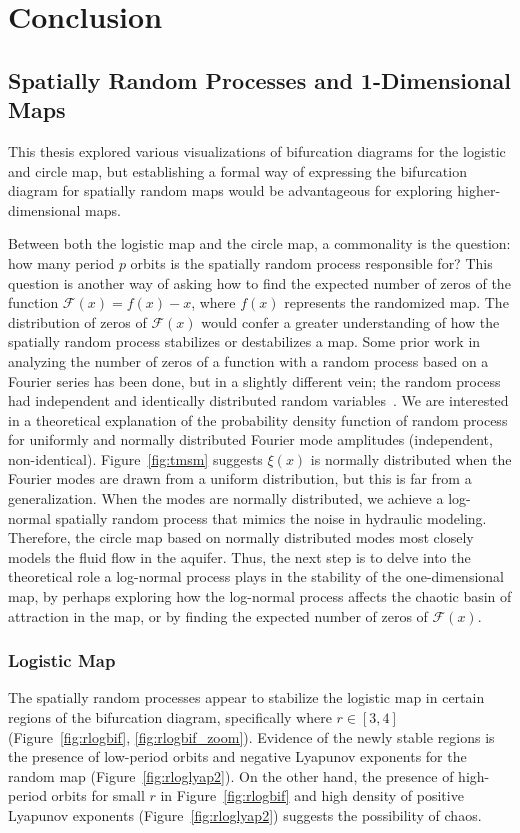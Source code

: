 \chapter{Conclusion}
\section{Spatially Random Processes and 1-Dimensional Maps}
This thesis explored various visualizations of bifurcation diagrams
for the logistic and circle map, but establishing a formal way of
expressing the bifurcation diagram for spatially random maps would
be advantageous for exploring higher-dimensional maps.

Between both the logistic map and the circle map, a commonality is the
question: how many period $p$ orbits is the spatially random process
responsible for? This question is another way of asking how to find
the expected number of zeros of the function $\mathcal{F}(x)=f(x)-x$, where $f(x)$ represents the
randomized map. The distribution of zeros of
$\mathcal{F}(x)$ would confer a greater understanding of how the
spatially random process stabilizes or destabilizes a map. Some prior
work in analyzing the number of zeros of a function with a random
process based on a Fourier series has been done, but in a slightly
different vein; the random process had independent and identically
distributed random variables~\cite{kahane}. We are interested in a theoretical
explanation of the probability density function of random process for
uniformly and normally distributed Fourier mode amplitudes
(independent, non-identical). Figure~\ref{fig:tmsm} suggests $\xi(x)$
is normally distributed when the Fourier modes are drawn from a
uniform distribution, but this is far from a generalization. When the
modes are normally distributed, we achieve a log-normal spatially
random process that mimics the noise in hydraulic modeling. Therefore,
the circle
map based on normally distributed modes most closely models the fluid
flow in the aquifer. Thus, the
next step is to delve into the theoretical role a log-normal process plays in the
stability of the one-dimensional map, by perhaps exploring how the
log-normal process affects the chaotic basin of attraction in the map,
or by finding the expected number of zeros of $\mathcal{F}(x)$.

\subsection{Logistic Map}
The spatially random processes appear to stabilize the logistic map in
certain regions of the bifurcation diagram, specifically where $r \in [3,4]$
(Figure~\ref{fig:rlogbif}, \ref{fig:rlogbif_zoom}). Evidence of the
newly stable regions is the presence of low-period orbits and negative
Lyapunov exponents for the random map (Figure~\ref{fig:rloglyap2}). On
the other hand, the presence of high-period orbits for
small $r$ in Figure~\ref{fig:rlogbif} and high density of positive
Lyapunov exponents (Figure~\ref{fig:rloglyap2}) suggests the possibility of chaos.

